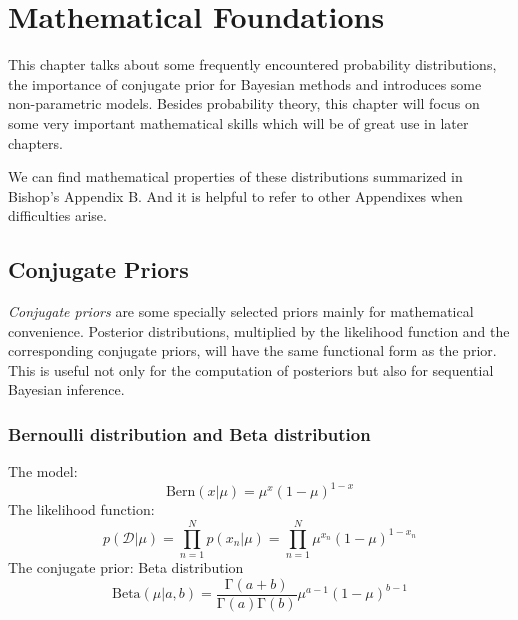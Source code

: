 \documentclass[a4paper]{book}
\newcommand{\up}{\mathrm}
\renewcommand{\cal}{\mathcal}
\newcommand{\imp}[1]{\textit{#1}}
\begin{document}
\chapter{Mathematical Foundations}
This chapter talks about some frequently encountered probability distributions, the importance of conjugate prior for Bayesian methods and introduces some non-parametric models. Besides probability theory, this chapter will focus on some very important mathematical skills which will be of great use in later chapters.

We can find mathematical properties of these distributions summarized in Bishop's Appendix B. And it is helpful to refer to other Appendixes when difficulties arise.
\section{Conjugate Priors}
\imp{Conjugate priors} are some specially selected priors mainly for mathematical convenience. Posterior distributions, multiplied by the likelihood function and the corresponding conjugate priors, will have the same functional form as the prior. This is useful not only for the computation of posteriors but also for sequential Bayesian inference.
\subsection{Bernoulli distribution and Beta distribution}
The model:
\begin{equation}
	\mathrm{Bern}(x|\mu)=\mu^{x}(1-\mu)^{1-x}
\end{equation}
The likelihood function:
\begin{equation}
	p(\cal{D}|\mu) = \prod_{n=1}^{N} p(x_n|\mu)=\prod_{n=1}^{N}\mu^{x_n}(1-\mu)^{1-x_n}
\end{equation}
The conjugate prior: Beta distribution
\begin{equation}
	\mathrm{Beta}(\mu|a,b)=\frac{\up{\Gamma}(a+b)}{\up{\Gamma}(a)\up{\Gamma}(b)}\mu^{a-1}(1-\mu)^{b-1}
\end{equation}
\end{document}
